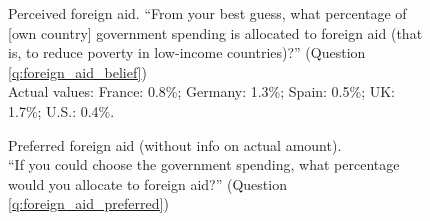 \documentclass[12pt,english]{article}
\begin{document}
\begin{figure}[h!]
    \caption[Perceived foreign aid]{Perceived foreign aid. ``From your best guess, what percentage of [own country] government spending is allocated to foreign aid (that is, to reduce poverty in low-income countries)?'' (Question \ref{q:foreign_aid_belief}) \\ Actual values: France: 0.8\%; Germany: 1.3\%; Spain: 0.5\%; UK: 1.7\%; U.S.: 0.4\%.}\label{fig:foreign_aid_belief}
\end{figure}

\begin{figure}[h!]
    \caption[Preferred foreign aid (without info on actual amount)]{Preferred foreign aid (without info on actual amount). \\ ``If you could choose the government spending, what percentage would you allocate
    to foreign aid?'' (Question \ref{q:foreign_aid_preferred})}\label{fig:foreign_aid_preferred_no_info}
\end{figure}
\end{document}
